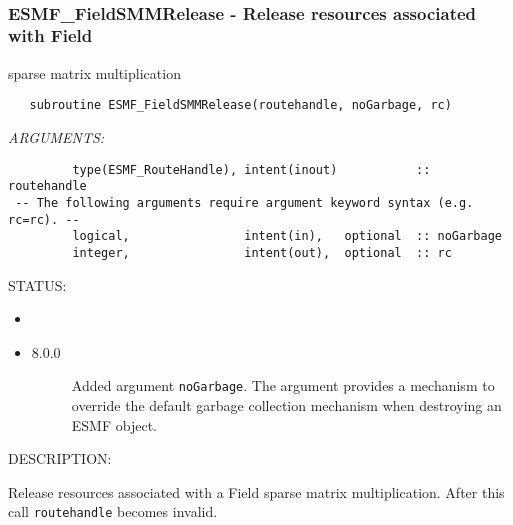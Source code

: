  
\mbox{}\hrulefill\ 
 
\subsubsection [ESMF\_FieldSMMRelease] {ESMF\_FieldSMMRelease - Release resources associated with Field }


   sparse matrix multiplication
  
\begin{verbatim}   subroutine ESMF_FieldSMMRelease(routehandle, noGarbage, rc)\end{verbatim}{\em ARGUMENTS:}
\begin{verbatim}         type(ESMF_RouteHandle), intent(inout)           :: routehandle
 -- The following arguments require argument keyword syntax (e.g. rc=rc). --
         logical,                intent(in),   optional  :: noGarbage
         integer,                intent(out),  optional  :: rc\end{verbatim}
{\sf STATUS:}
   \begin{itemize}
   \item{}
   \item{}
   \begin{description}
   \item[8.0.0] Added argument {\tt noGarbage}.
     The argument provides a mechanism to override the default garbage collection
     mechanism when destroying an ESMF object.
   \end{description}
   \end{itemize}
  
{\sf DESCRIPTION:\\ }


     Release resources associated with a Field sparse matrix multiplication. After this call
     {\tt routehandle} becomes invalid.
  
